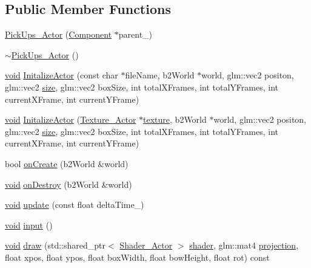 \subsection*{Public Member Functions}
\begin{DoxyCompactItemize}
\item 
\hyperlink{classPickUps__Actor_abd87640259cb2e25dc4eae1311e0175e}{Pick\+Ups\+\_\+\+Actor} (\hyperlink{classComponent}{Component} $\ast$parent\+\_\+)
\item 
\hyperlink{classPickUps__Actor_ac6093eccf1512b7a66876038496107e5}{$\sim$\+Pick\+Ups\+\_\+\+Actor} ()
\item 
\hyperlink{imgui__impl__opengl3__loader_8h_ac668e7cffd9e2e9cfee428b9b2f34fa7}{void} \hyperlink{classPickUps__Actor_af465c835fb431671fa437b5bf209e51d}{Initalize\+Actor} (const char $\ast$file\+Name, b2\+World $\ast$world, glm\+::vec2 positon, glm\+::vec2 \hyperlink{imgui__impl__opengl3__loader_8h_a3d1e3edfcf61ca2d831883e1afbad89e}{size}, glm\+::vec2 box\+Size, int total\+X\+Frames, int total\+Y\+Frames, int current\+X\+Frame, int current\+Y\+Frame)
\item 
\hyperlink{imgui__impl__opengl3__loader_8h_ac668e7cffd9e2e9cfee428b9b2f34fa7}{void} \hyperlink{classPickUps__Actor_a0e2fa168ce8586fcc4f69a2ff824c801}{Initalize\+Actor} (\hyperlink{classTexture__Actor}{Texture\+\_\+\+Actor} $\ast$\hyperlink{imgui__impl__opengl3__loader_8h_a0b57774cb59b667df4a205ae0b1a50e2}{texture}, b2\+World $\ast$world, glm\+::vec2 positon, glm\+::vec2 \hyperlink{imgui__impl__opengl3__loader_8h_a3d1e3edfcf61ca2d831883e1afbad89e}{size}, glm\+::vec2 box\+Size, int total\+X\+Frames, int total\+Y\+Frames, int current\+X\+Frame, int current\+Y\+Frame)
\item 
bool \hyperlink{classPickUps__Actor_aec7751b6c40d081160740669a59af7bb}{on\+Create} (b2\+World \&world)
\item 
\hyperlink{imgui__impl__opengl3__loader_8h_ac668e7cffd9e2e9cfee428b9b2f34fa7}{void} \hyperlink{classPickUps__Actor_a0b159c7f94f6a36497a350924dd41e73}{on\+Destroy} (b2\+World \&world)
\item 
\hyperlink{imgui__impl__opengl3__loader_8h_ac668e7cffd9e2e9cfee428b9b2f34fa7}{void} \hyperlink{classPickUps__Actor_a3f098ecced007eaa97719faaf7ba35d4}{update} (const float delta\+Time\+\_\+)
\item 
\hyperlink{imgui__impl__opengl3__loader_8h_ac668e7cffd9e2e9cfee428b9b2f34fa7}{void} \hyperlink{classPickUps__Actor_aacd9aee15846715f30259aba89a5d83f}{input} ()
\item 
\hyperlink{imgui__impl__opengl3__loader_8h_ac668e7cffd9e2e9cfee428b9b2f34fa7}{void} \hyperlink{classPickUps__Actor_a4e3094c5847d4b712718a04839fce966}{draw} (std\+::shared\+\_\+ptr$<$ \hyperlink{classShader__Actor}{Shader\+\_\+\+Actor} $>$ \hyperlink{imgui__impl__opengl3__loader_8h_a57b2a96adb1d51204909a82d861e395e}{shader}, glm\+::mat4 \hyperlink{main__menu__state_8cpp_a565d92bfbcc4a481d2d35f3850a382f7}{projection}, float xpos, float ypos, float box\+Width, float bow\+Height, float rot) const

\end{DoxyCompactItemize}
